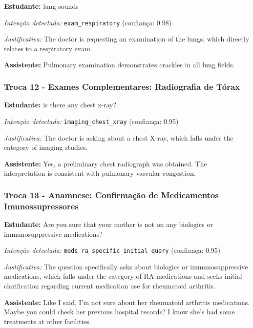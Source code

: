 \textbf{Estudante:} lung sounds

\textit{Intenção detectada:} \texttt{exam\_respiratory} (confiança: 0.98)

\textit{Justificativa:} The doctor is requesting an examination of the lungs, which directly relates to a respiratory exam.

\textbf{Assistente:} Pulmonary examination demonstrates crackles in all lung fields.

\vspace{0.5cm}

\subsubsection*{Troca 12 - Exames Complementares: Radiografia de Tórax}

\textbf{Estudante:} is there any chest x-ray?

\textit{Intenção detectada:} \texttt{imaging\_chest\_xray} (confiança: 0.95)

\textit{Justificativa:} The doctor is asking about a chest X-ray, which falls under the category of imaging studies.

\textbf{Assistente:} Yes, a preliminary chest radiograph was obtained. The interpretation is consistent with pulmonary vascular congestion.

\vspace{0.5cm}

\subsubsection*{Troca 13 - Anamnese: Confirmação de Medicamentos Imunossupressores}

\textbf{Estudante:} Are you sure that your mother is not on any biologics or immunosuppressive medications?

\textit{Intenção detectada:} \texttt{meds\_ra\_specific\_initial\_query} (confiança: 0.95)

\textit{Justificativa:} The question specifically asks about biologics or immunosuppressive medications, which falls under the category of RA medications and seeks initial clarification regarding current medication use for rheumatoid arthritis.

\textbf{Assistente:} Like I said, I'm not sure about her rheumatoid arthritis medications. Maybe you could check her previous hospital records? I know she's had some treatments at other facilities.

\vspace{0.5cm}

